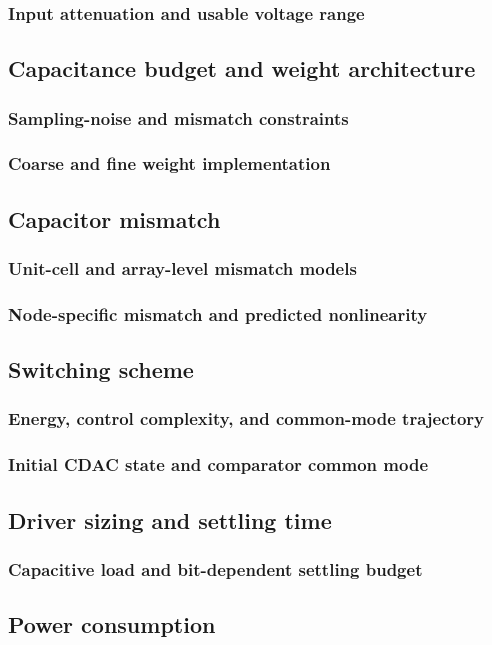 \documentclass[PhD, UKenglish]{scrbook}
\begin{document}
\subsubsection{Input attenuation and usable voltage range}
\subsection{Capacitance budget and weight architecture}
\subsubsection{Sampling-noise and mismatch constraints}
\subsubsection{Coarse and fine weight implementation}
\subsection{Capacitor mismatch}
\subsubsection{Unit-cell and array-level mismatch models}
\subsubsection{Node-specific mismatch and predicted nonlinearity}
\subsection{Switching scheme}
\subsubsection{Energy, control complexity, and common-mode trajectory}
\subsubsection{Initial CDAC state and comparator common mode}
\subsection{Driver sizing and settling time}
\subsubsection{Capacitive load and bit-dependent settling budget}
\subsection{Power consumption}
\end{document}
